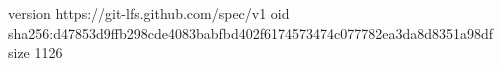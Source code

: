 version https://git-lfs.github.com/spec/v1
oid sha256:d47853d9ffb298cde4083babfbd402f6174573474c077782ea3da8d8351a98df
size 1126

